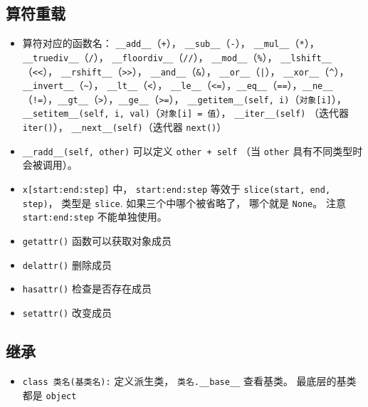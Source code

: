 \subsection{算符重载}
\begin{itemize}
\item 算符对应的函数名： \verb`__add__`（\verb`+`）， \verb`__sub__`（\verb`-`）， \verb`__mul__`（\verb`*`）， \verb`__truediv__`（\verb`/`）， \verb`__floordiv__`（\verb`//`）， \verb`__mod__`（\verb`%`）， \verb`__lshift__`（\verb`<<`）， \verb`__rshift__`（\verb`>>`）， \verb`__and__`（\verb`&`）， \verb`__or__`（\verb`|`）， \verb`__xor__`（\verb`^`）， \verb`__invert__`（\verb`~`）， \verb`__lt__`（\verb`<`）， \verb`__le__`（\verb`<=`），\verb`__eq__`（\verb`==`），\verb`__ne__`（\verb`!=`），\verb`__gt__`（\verb`>`），\verb`__ge__`（\verb`>=`）， \verb`__getitem__(self, i)`（\verb`对象[i]`）， \verb`__setitem__(self, i, val)`（\verb`对象[i] = 值`）， \verb`__iter__(self)` （迭代器 \verb`iter()`）， \verb`__next__(self)`（迭代器 \verb`next()`）
\item \verb`__radd__(self, other)` 可以定义 \verb`other + self` （当 \verb`other` 具有不同类型时会被调用）。
\item \verb`x[start:end:step]` 中， \verb`start:end:step` 等效于 \verb`slice(start, end, step)`， 类型是 \verb`slice`. 如果三个中哪个被省略了， 哪个就是 \verb`None`。 注意 \verb`start:end:step` 不能单独使用。
\item \verb`getattr()` 函数可以获取对象成员
\item  \verb`delattr()` 删除成员
\item \verb`hasattr()` 检查是否存在成员
\item \verb`setattr()` 改变成员
\end{itemize}

\subsection{继承}
\begin{itemize}
\item \verb`class 类名(基类名):` 定义派生类， \verb`类名.__base__` 查看基类。 最底层的基类都是 \verb`object`
\end{itemize}

